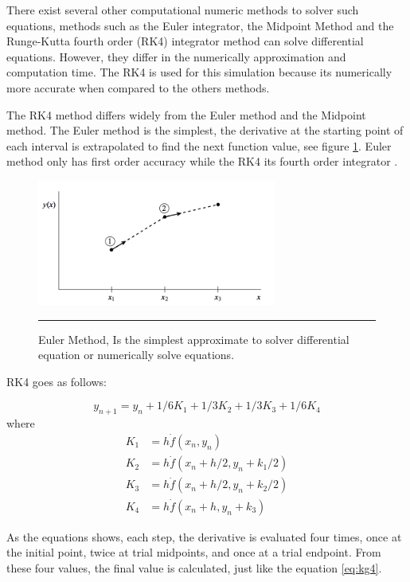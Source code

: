 There exist several other computational numeric methods to solver such equations, methods such as the Euler integrator, the Midpoint Method and the Runge-Kutta fourth order (RK4) integrator method can solve differential equations. However, they differ in the numerically approximation and computation time. The RK4 is used for this simulation because its numerically more accurate when compared to the others methods.

The RK4 method differs widely from the Euler method and the Midpoint method. The Euler method is the simplest, the derivative at the starting point of each interval is extrapolated to find the next function value, see figure \ref{fig:euler}. Euler method only has first order accuracy while the RK4 its fourth order integrator \cite{numerical}.

\begin{figure}[htbp]
	\centering
		\includegraphics[width=0.7\textwidth]{Figures/euler.png}
		\rule{35em}{0.4pt}
	\caption[Euler Method]{Euler Method, Is the simplest approximate to solver differential equation or numerically solve equations.}
	\label{fig:euler}
\end{figure}

RK4 goes as follows:

\begin{equation} \label{eq:rk4}
y_{n+1} = y_{n} + 1/6 K_{1} + 1/3 K_{2} +1/3 K_{3} + 1/6 K_{4}
\end{equation}
where
\begin{equation}
\begin{split} \label{eq:rksplit}
K_{1} &= h \dot f(x_{n}, y_{n}) \\
K_{2} &= h \dot f(x_{n} + h/2, y_{n} + k_{1}/2) \\
K_{3} &= h \dot f(x_{n} + h/2, y_{n} + k_{2}/2) \\
K_{4} &= h \dot f(x_{n} + h, y_{n} + k_{3})
\end{split}
\end{equation}

As the equations shows, each step, the derivative is evaluated four times, once at the initial point, twice at trial midpoints, and once at a trial endpoint. From these four values, the final value is calculated, just like the equation \ref{eq:kg4}.

